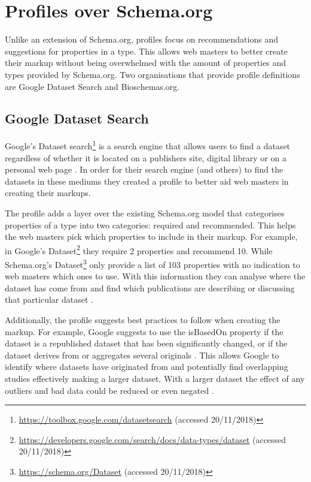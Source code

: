\section{Profiles over Schema.org}
Unlike an extension of Schema.org, profiles focus on recommendations and suggestions for properties in a type. This allows web masters to better create their markup without being overwhelmed with the amount of properties and types provided by Schema.org. Two organisations that provide profile definitions are Google Dataset Search and Bioschemas.org.

\subsection{Google Dataset Search}
Google's Dataset search\footnote{\url{https://toolbox.google.com/datasetsearch} (accessed 20/11/2018)} is a search engine that allows users to find a dataset regardless of whether it is located on a publishers site, digital library or on a personal web page \cite{blogGoogleData}. In order for their search engine (and others) to find the datasets in these mediums they created a profile to better aid web masters in creating their markups.  

The profile adds a layer over the existing Schema.org model that categorises properties of a type into two categories: required and recommended. This helps the web masters pick which properties to include in their markup. For example, in Google's Dataset\footnote{\url{https://developers.google.com/search/docs/data-types/dataset} (accessed 20/11/2018)} they require 2 properties and recommend 10. While Schema.org's Dataset\footnote{\url{https://schema.org/Dataset} (accessed 20/11/2018)} only provide a list of 103 properties with no indication to web masters which ones to use. With this information they can analyse where the dataset has come from and find which publications are describing or discussing that particular dataset \cite{googleDatasetBlog}.

Additionally, the profile suggests best practices to follow when creating the markup. For example, Google suggests to use the isBasedOn property if the dataset is a republished dataset that has been significantly changed, or if the dataset derives from or aggregates several originals \cite{googleDataset}. This allows Google to identify where datasets have originated from and potentially find overlapping studies effectively making a larger dataset. With a larger dataset the effect of any outliers and bad data could be reduced or even negated \cite{googleDatasetCMS}.


